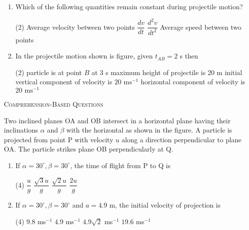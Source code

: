 \documentclass{article}
\renewcommand{\frac}[2]{\dfrac{#1}{#2}}
\begin{document}
\begin{enumerate}
    \item Which of the following quantities remain constant during projectile motion?
    \begin{tasks}(2)
        \task Average velocity between two points
        \task \( \frac{dv}{dt} \)
        \task \( \frac{d^2v}{dt^2} \)
        \task Average speed between two points
    \end{tasks}
    
    \item In the projectile motion shown is figure, given \( t_{AB} = 2 \) s then
    \begin{center}
        \end{center}
    \begin{tasks}(2)
        \task particle is at point \( B \) at 3 s
        \task maximum height of projectile is 20 m
        \task initial vertical component of velocity is \( 20 \text{ ms}^{-1} \)
        \task horizontal component of velocity is \( 20 \text{ ms}^{-1} \)
    \end{tasks}
\end{enumerate}


\begin{center}
    \textsc{Comprehension-Based Questions}
\end{center}
Two inclined planes OA and OB intersect in a horizontal plane having their inclinations $\alpha$ and $\beta$ with the horizontal as shown in the figure. A particle is projected from point P with velocity $u$ along a direction perpendicular to plane OA. The particle strikes plane OB perpendicularly at Q.

\begin{center}
\end{center}

\begin{enumerate}
    \item If $\alpha = 30^\circ, \beta = 30^\circ$, the time of flight from P to Q is
    \begin{tasks}(4)
        \task $\frac{u}{g}$
        \task $\frac{\sqrt{3}u}{g}$
        \task $\frac{\sqrt{2}u}{g}$
        \task $\frac{2u}{g}$
    \end{tasks}
    
    \item If $\alpha = 30^\circ, \beta = 30^\circ$ and $a = 4.9$ m, the initial velocity of projection is
    \begin{tasks}(4)
        \task $9.8$ ms$^{-1}$
        \task $4.9$ ms$^{-1}$
        \task $4.9\sqrt{2}$ ms$^{-1}$
        \task $19.6$ ms$^{-1}$
    \end{tasks}
\end{enumerate}
\end{document}
